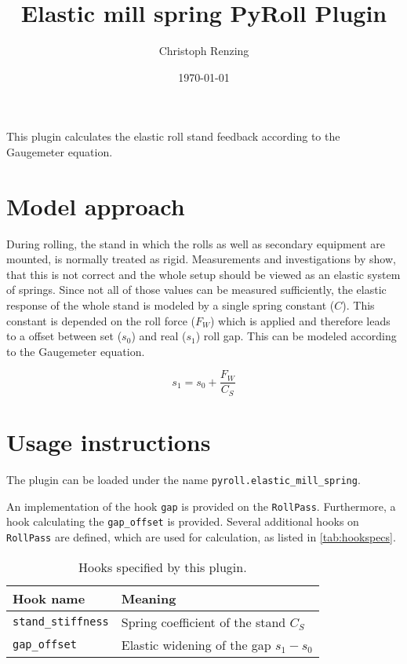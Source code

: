 \documentclass[11pt]{PyRollDocs}
\begin{document}
    \title{Elastic mill spring PyRoll Plugin}
    \author{Christoph Renzing}
    \date{\today}

    \maketitle

    This plugin calculates the elastic roll stand feedback according to the Gaugemeter equation.


    \section{Model approach}\label{sec:model-approach}

    During rolling, the stand in which the rolls as well as secondary equipment are mounted, is normally treated as rigid.
    Measurements and investigations by \textcite{Weber1973} show, that this is not correct and the whole setup should be viewed as an elastic system of springs.
    Since not all of those values can be measured sufficiently, the elastic response of the whole stand is modeled by a single spring constant ($C$).
    This constant is depended on the roll force ($F_W$) which is applied and therefore leads to a offset between set ($s_0$) and real ($s_1$) roll gap.
    This can be modeled according to the Gaugemeter equation.

    \begin{equation}
        s_1 = s_0 + \frac{F_W}{C_S}
        \label{eq:gaugemeter-equation}
    \end{equation}


    \section{Usage instructions}\label{sec:usage-instructions}

    The plugin can be loaded under the name \texttt{pyroll.elastic\_mill\_spring}.

    An implementation of the hook \lstinline{gap} is provided on the \lstinline{RollPass}.
    Furthermore, a hook calculating the \lstinline{gap_offset} is provided.
    Several additional hooks on \lstinline{RollPass} are defined, which are used for calculation, as listed in \autoref{tab:hookspecs}.

    \begin{table}
        \centering
        \caption{Hooks specified by this plugin.}
        \label{tab:hookspecs}
        \begin{tabular}{ll}
            \toprule
            Hook name                       & Meaning                              \\
            \midrule
            \texttt{stand\_stiffness} & Spring coefficient of the stand  $C_S$ \\
            \texttt{gap\_offset} & Elastic widening of the gap $s_1-s_0$ \\
            \bottomrule
        \end{tabular}
    \end{table}

    \printbibliography
\end{document}
